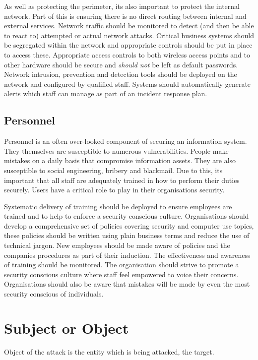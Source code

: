 As well as protecting the perimeter, its also important to protect the internal network. Part of this is ensuring there is no direct routing between internal and external services. Network traffic should be monitored to detect (and then be able to react to) attempted or actual network attacks. Critical business systems should be segregated within the network and appropriate controls should be put in place to access these. Appropriate access controls to both wireless access points and to other hardware should be secure and \textit{should not} be left as default passwords. Network intrusion, prevention and detection tools should be deployed on the network and configured by qualified staff. Systems should automatically generate alerts which staff can manage as part of an incident response plan. 

\subsection*{Personnel}
Personnel is an often over-looked component of securing an information system. They themselves are susceptible to numerous vulnerabilities. People make mistakes on a daily basis that compromise information assets. They are also susceptible to social engineering, bribery and blackmail. Due to this, its important that all staff are adequately trained in how to perform their duties securely. Users have a critical role to play in their organisations security.

Systematic delivery of training should be deployed to ensure employees are trained and to help to enforce a security conscious culture. Organisations should develop a comprehensive set of policies covering security and computer use topics, these policies should be written using plain business terms and reduce the use of technical jargon. New employees should be made aware of policies and the companies procedures as part of their induction. The effectiveness and awareness of training should be monitored. The organisation should strive to promote a security conscious culture where staff feel empowered to voice their concerns. Organisations should also be aware that mistakes will be made by even the most security conscious of individuals. 

\section*{Subject or Object}
Object of the attack is the entity which is being attacked, the target. 

